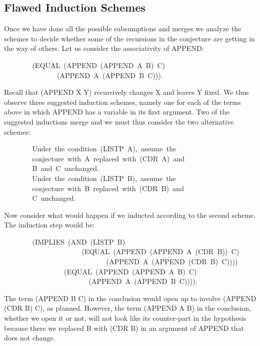 \documentclass[11pt]{book}
\newenvironment{pubasis}{\begin{flushleft}\ttfamily\small}{\normalsize\rmfamily\end{flushleft}}
\newcommand{\pubdefaulttextsize}{\large}
\begin{document}
\subsection{Flawed Induction Schemes}
\pubdefaulttextsize
Once we have done all the possible subsumptions and merges we analyze the
schemes to decide whether some of the recursions in the conjecture
are getting in the way of others.  Let us consider the
associativity of APPEND:
\begin{pubasis}
~~~~~~~~(EQUAL~(APPEND~(APPEND~A~B)~C)\\
~~~~~~~~~~~~~~~(APPEND~A~(APPEND~B~C))).\\
\end{pubasis}
Recall that (APPEND X Y) recursively changes X and leaves
Y fixed.  We thus observe three suggested induction schemes,
namely one for each of the terms above in which APPEND has a variable
in its first argument.  Two of the suggested inductions merge
and we must thus consider the two alternative schemes:
\begin{pubasis}
~~~~~~~~Under~the~condition~(LISTP~A),~assume~the\\
~~~~~~~~conjecture~with~A~replaced~with~(CDR~A)~and\\
~~~~~~~~B~and~C~unchanged.\\

~~~~~~~~Under~the~condition~(LISTP~B),~assume~the\\
~~~~~~~~conjecture~with~B~replaced~with~(CDR~B)~and\\
~~~~~~~~C~unchanged.\\
\end{pubasis}
Now consider what would happen if we inducted according to the second
scheme.  The induction step would be:
\begin{pubasis}
~~~~~~~~(IMPLIES~(AND~(LISTP~B)\\
~~~~~~~~~~~~~~~~~~~~~~(EQUAL~(APPEND~(APPEND~A~(CDR~B))~C)\\
~~~~~~~~~~~~~~~~~~~~~~~~~~~~~(APPEND~A~(APPEND~(CDR~B)~C))))\\
~~~~~~~~~~~~~~~~~(EQUAL~(APPEND~(APPEND~A~B)~C)\\
~~~~~~~~~~~~~~~~~~~~~~~~(APPEND~A~(APPEND~B~C)))).\\
\end{pubasis}
The term (APPEND B C) in the conclusion would open up to involve
(APPEND (CDR B) C), as planned.  However, the term (APPEND A B) in the
conclusion, whether we open it or not, will not look like its counter-part
in the hypothesis because there we replaced B with (CDR B) in an
argument of APPEND that does not change.
\end{document}
